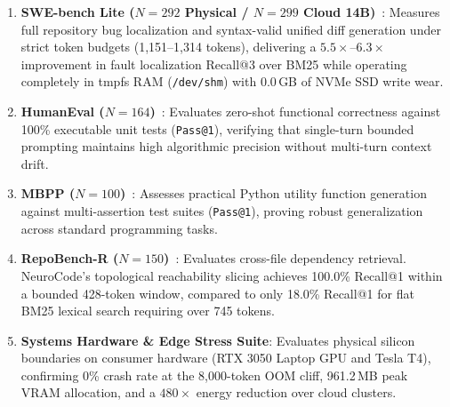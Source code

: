 \begin{enumerate}
    \item \textbf{SWE-bench Lite ($N=292$ Physical / $N=299$ Cloud 14B)}~\cite{jimenez2024swebench}: Measures full repository bug localization and syntax-valid unified diff generation under strict token budgets (1,151--1,314 tokens), delivering a $5.5\times$--$6.3\times$ improvement in fault localization Recall@3 over BM25 while operating completely in tmpfs RAM (\texttt{/dev/shm}) with 0.0\,GB of NVMe SSD write wear.
    \item \textbf{HumanEval ($N=164$)}~\cite{chen2021humaneval}: Evaluates zero-shot functional correctness against 100\% executable unit tests (\texttt{Pass@1}), verifying that single-turn bounded prompting maintains high algorithmic precision without multi-turn context drift.
    \item \textbf{MBPP ($N=100$)}~\cite{austin2021mbpp}: Assesses practical Python utility function generation against multi-assertion test suites (\texttt{Pass@1}), proving robust generalization across standard programming tasks.
    \item \textbf{RepoBench-R ($N=150$)}~\cite{liu2023repobench}: Evaluates cross-file dependency retrieval. NeuroCode's topological reachability slicing achieves 100.0\% Recall@1 within a bounded 428-token window, compared to only 18.0\% Recall@1 for flat BM25 lexical search requiring over 745 tokens.
    \item \textbf{Systems Hardware \& Edge Stress Suite}: Evaluates physical silicon boundaries on consumer hardware (RTX 3050 Laptop GPU and Tesla T4), confirming 0\% crash rate at the 8,000-token OOM cliff, 961.2\,MB peak VRAM allocation, and a $480\times$ energy reduction over cloud clusters.
\end{enumerate}

